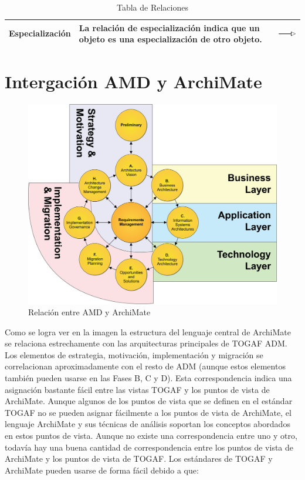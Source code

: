 \begin{table}[H]
\begin{tabular}{| m{4cm} | m{4cm} | m{4cm} | }
		\hline
		\centering\vspace{1.52mm}Especialización& \vspace{1.52mm}La relación de especialización indica que un objeto es una especialización de otro objeto.& \vspace{1.52mm}\includegraphics[width=20mm]{arquitectura/imagenes/412} \\
		\hline
	\end{tabular}
	\caption{Tabla de Relaciones}
	\label{fig:relaciones}
\end{table}


\section{Intergación AMD y ArchiMate}

\begin{figure}[h]
	\centering
	\includegraphics[width=0.7\linewidth]{arquitectura/imagenes/AMD_ArchiMate}
	\caption{Relación entre AMD y ArchiMate}
	\label{fig:amdarchimate}
\end{figure}


Como se logra ver en la imagen la estructura del lenguaje central de ArchiMate se relaciona estrechamente con las arquitecturas principales de TOGAF ADM. Los elementos de estrategia, motivación, implementación y migración se correlacionan aproximadamente con el resto de ADM (aunque estos elementos también pueden usarse en las Fases B, C y D). Esta correspondencia indica una asignación bastante fácil entre las vistas TOGAF y los puntos de vista de ArchiMate.
\newline
Aunque algunos de los puntos de vista que se definen en el estándar TOGAF no se pueden asignar fácilmente a los puntos de vista de ArchiMate, el lenguaje ArchiMate y sus técnicas de análisis soportan los conceptos abordados en estos puntos de vista. Aunque no existe una correspondencia entre uno y otro, todavía hay una buena cantidad de correspondencia entre los puntos de vista de ArchiMate y los puntos de vista de TOGAF.
\newline
Los estándares de TOGAF y ArchiMate pueden usarse de forma fácil debido a que:

